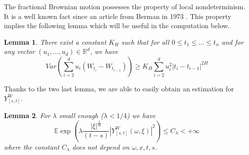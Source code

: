 \documentclass[11pt,a4paper,draft,reqno]{amsart}
\newtheorem{lemma}{Lemma}
\theoremstyle{definition}
\newcommand{\RR}{\mathbb{R}}
\newcommand{\expect}{\mathbb{E}}
\begin{document}
\noindent The fractional Brownian motion possesses the property of local nondeterminism. It is a well known fact since an article from Berman in 1973 \cite{MR0317397}.  This property implies the following lemma which will be useful in the computation below.
\begin{lemma}\label{lemma NRT}
There exist a constant $K_H$ such that for all $0\le t_1\le \dots \le t_n$ and for any vector $(u_1,\dots, u_d)\in\RR^d$, we
have
$$Var\left(\sum_{i=2}^d u_i \left(W_{t_{i}}-W_{t_{i-1}}\right)\right)\ge K_H \sum_{i=2}^d u_i^2|t_i-t_{i-1}|^{2H}$$
\end{lemma}
Thanks to the two last lemma, we are able to easily obtain an estimation for $Y_{[s,t]}^W$.
\begin{lemma}\label{lemma estimation L1}
 For $\lambda$ small enough ($\lambda<1/4$) we have
 $$ \expect
 \exp\left(\lambda\frac{|\xi|^{\frac 1 H}} {(t-s)} |Y_{[s,t]}^W(\omega,\xi)|^2\right)
\le C_\lambda <+\infty $$
 where the constant $C_\lambda$ does not depend on $\omega,x,t,s$.
\end{lemma}
\end{document}
